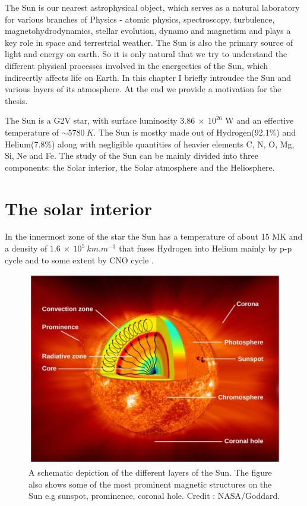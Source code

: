 

The Sun is our nearest astrophysical object, which serves as a natural laboratory for various branches of Physics - atomic physics, spectroscopy, turbulence, magnetohydrodynamics, stellar evolution, dynamo and magnetism and plays a key role in space and terrestrial weather. The Sun is also the primary source of light and energy on earth. So it is only natural that we try to understand the different physical processes involved in the energectics of the Sun, which indirecrtly affects life on Earth. In this chapter I briefly introudce the Sun and various layers of its atmosphere. At the end we provide a motivation for the thesis.

The Sun is a G2V star, with surface luminosity $3.86~\times~10^{26}$ W and an effective temperature of $\sim 5780~K$. The Sun is mostky made out of Hydrogen(92.1\%) and Helium(7.8\%) along with negligible quantities of heavier elements C, N, O, Mg, Si, Ne and Fe. The study of the Sun can be mainly divided into three components: the Solar interior, the Solar atmosphere and the Heliosphere.

\section{The solar interior}\label{solar_int}

In the innermost zone of the star the Sun has a temperature of about 15 MK and a density of $1.6~\times~10^{5}~km.m^{-3}$ that fuses Hydrogen into Helium mainly by p-p cycle and to some extent by CNO cycle . 

\begin{figure}[h!]
    \centering
    \includegraphics[width = 0.8\linewidth]{Figures/solar_int.png}
    \caption{A schematic depiction of the different layers of the Sun. The figure also shows some of the most prominent magnetic structures on the Sun e.g sunspot, prominence, coronal hole. Credit : NASA/Goddard. }
    \label{fig_solar_int}
\end{figure}

